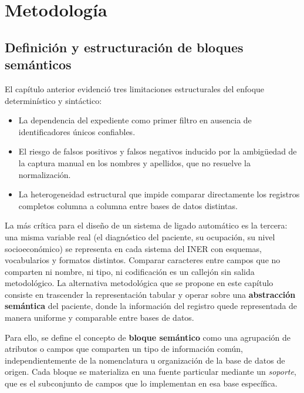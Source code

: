 \chapter{Metodología}
\section{Definición y estructuración de bloques semánticos}
\label{sec:bloques_semanticos}

El capítulo anterior evidenció tres limitaciones estructurales del enfoque determinístico y sintáctico:

\begin{itemize}
    \item La dependencia del expediente como primer filtro en ausencia de identificadores únicos confiables.
    \item El riesgo de falsos positivos y falsos negativos inducido por la ambigüedad de la captura manual en los nombres y apellidos, que no resuelve la normalización.
    \item La heterogeneidad estructural que impide comparar directamente los registros completos columna a columna entre bases de datos distintas.
\end{itemize}

La más crítica para el diseño de un sistema de ligado automático es la tercera: una misma variable real (el diagnóstico del paciente, su ocupación, su nivel socioeconómico) se representa en cada sistema del INER con esquemas, vocabularios y formatos distintos. Comparar caracteres entre campos que no comparten ni nombre, ni tipo, ni codificación es un callejón sin salida metodológico. La alternativa metodológica que se propone en este capítulo consiste en trascender la representación tabular y operar sobre una \textbf{abstracción semántica} del paciente, donde la información del registro quede representada de manera uniforme y comparable entre bases de datos.

Para ello, se define el concepto de \textbf{bloque semántico} como una agrupación de atributos o campos que comparten un tipo de información común, independientemente de la nomenclatura u organización de la base de datos de origen. Cada bloque se materializa en una fuente particular mediante un \textit{soporte}, que es el subconjunto de campos que lo implementan en esa base específica.

